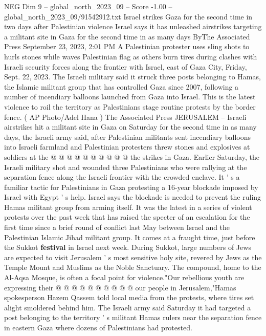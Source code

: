 \begin{textsample}{NEG Dim 9 – global\_north\_2023\_09 – Score -1.00 – global\_north\_2023\_09/91542912.txt}  \label{ex:f9_neg_435}
Israel strikes Gaza for the second time in two days after Palestinian violence Israel says it has unleashed airstrikes targeting a militant site in Gaza for the second time in as many days ByThe Associated Press September 23, 2023, 2:01 PM A Palestinian protester uses sling shots to hurls stones while waves Palestinian flag as others burn tires during clashes with Israeli security forces along the frontier with Israel, east of Gaza City, Friday, Sept. 22, 2023.
The Israeli military said it struck three posts belonging to Hamas, the Islamic militant group that has controlled Gaza since 2007, following a number of incendiary balloons launched from Gaza into Israel.
This is the latest violence to roil the territory as Palestinians stage routine protests by the border fence. ( AP Photo/Adel Hana ) The Associated Press JERUSALEM -- Israeli airstrikes hit a militant site in Gaza on Saturday for the second time in as many days, the Israeli army said, after Palestinian militants sent incendiary balloons into Israeli farmland and Palestinian protesters threw stones and explosives at soldiers at the @ @ @ @ @ @ @ @ @ @ the strikes in Gaza.
Earlier Saturday, the Israeli military shot and wounded three Palestinians who were rallying at the separation fence along the Israeli frontier with the crowded enclave.
It ' s a familiar tactic for Palestinians in Gaza protesting a 16-year blockade imposed by Israel with Egypt ' s help.
Israel says the blockade is needed to prevent the ruling Hamas militant group from arming itself.
It was the latest in a series of violent protests over the past week that has raised the specter of an escalation for the first time since a brief round of conflict last May between Israel and the Palestinian Islamic Jihad militant group.
It comes at a fraught time, just before the Sukkot \textbf{festival} in Israel next week.
During Sukkot, large numbers of Jews are expected to visit Jerusalem ' s most sensitive holy site, revered by Jews as the Temple Mount and Muslims as the Noble Sanctuary.
The compound, home to the Al-Aqsa Mosque, is often a focal point for violence."Our rebellious youth are expressing their @ @ @ @ @ @ @ @ @ @ our people in Jerusalem,"Hamas spokesperson Hazem Qassem told local media from the protests, where tires set alight smoldered behind him.
The Israeli army said Saturday it had targeted a post belonging to the territory ' s militant Hamas rulers near the separation fence in eastern Gaza where dozens of Palestinians had protested.

\end{textsample}
